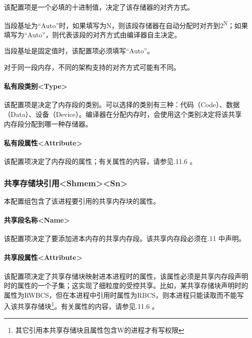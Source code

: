 该配置项是一个必填的十进制值，决定了该存储器的对齐方式。

当段基址为``Auto''时，如果填写为N，则该段存储器在自动分配时对齐到2\textsuperscript{N}；如果填写为``Auto''，则代表该段的对齐方式由编译器自主决定。

当段基址是固定值时，该配置项必须填写``Auto''。

对于同一段内存，不同的架构支持的对齐方式可能有不同。

\paragraph{私有段类别<Type>{}}\label{par:5-3-14-14-5}

该配置项是决定了内存段的类别。可以选择的类别有三种：代码（Code）、数据（Data）、设备（Device）。编译器在分配内存时，会使用这个类别决定将该共享内存段分配到哪一种存储器。

\paragraph{私有段属性<Attribute>{}}\label{par:5-3-14-14-6}

该配置项决定了内存段的属性；有关属性的内容，请参见.11.6
。

\subsubsection{共享存储块引用<Shmem><Sn>{}}\label{subsubsec:5-3-14-15}

本配置组包含了该进程要引用的共享内存块的属性。

\paragraph{共享段名称<Name>{}}\label{par:5-3-14-15-1}

该配置项决定了要添加进本内存的共享内存段。该共享内存段必须在.11
中声明。

\paragraph{共享段属性<Attribute>{}}\label{par:5-3-14-15-2}

该配置项决定了共享存储块映射进本进程时的属性，该属性必须是共享内存段声明时的属性的一个子集；这实现了细粒度的受控共享。比如，某共享存储块声明时的属性为RWBCS，但在本进程中引用时属性为RBCS，则本进程只能读取而不能写入该共享存储块\footnote{其它引用本共享存储块且属性包含W的进程才有写权限}。有关属性的内容，请参见.11.6
。

